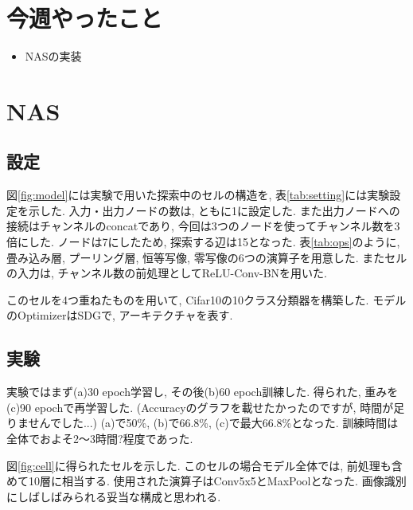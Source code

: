 \documentclass[twocolumn]{jarticle}     %
\begin{document}


\section{今週やったこと}
\begin{itemize}
	\item {NASの実装}
\end{itemize}

\section{NAS}
\subsection{設定}
図\ref{fig:model}には実験で用いた探索中のセルの構造を,
表\ref{tab:setting}には実験設定を示した.
入力・出力ノードの数は, ともに1に設定した.
また出力ノードへの接続はチャンネルのconcatであり, 今回は3つのノードを使ってチャンネル数を3倍にした.
ノードは7にしたため, 探索する辺は15となった.
表\ref{tab:ops}のように, 畳み込み層, プーリング層, 恒等写像, 零写像の6つの演算子を用意した.
またセルの入力は, チャンネル数の前処理としてReLU-Conv-BNを用いた.

このセルを4つ重ねたものを用いて, Cifar10の10クラス分類器を構築した.
モデルのOptimizerはSDGで, アーキテクチャを表す.

\subsection{実験}
実験ではまず(a)30 epoch学習し,
その後(b)60 epoch訓練した.
得られた, 重みを(c)90 epochで再学習した.
(Accuracyのグラフを載せたかったのですが, 時間が足りませんでした...)
(a)で50\%, (b)で66.8\%, (c)で最大66.8\%となった.
訓練時間は全体でおよそ2～3時間?程度であった.

図\ref{fig:cell}に得られたセルを示した.
このセルの場合モデル全体では, 前処理も含めて10層に相当する.
使用された演算子はConv5x5とMaxPoolとなった.
画像識別にしばしばみられる妥当な構成と思われる.
\end{document}
